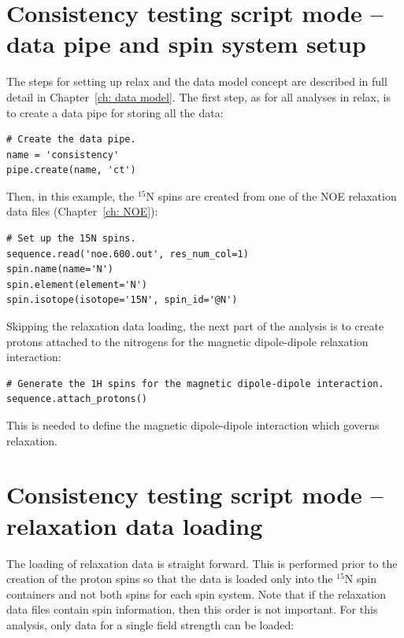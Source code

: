 
\section{Consistency testing script mode -- data pipe and spin system setup}

The steps for setting up relax and the data model concept are described in full detail in Chapter~\ref{ch: data model}.
The first step, as for all analyses in relax, is to create a data pipe for storing all the data:

\begin{lstlisting}[firstnumber=31]
# Create the data pipe.
name = 'consistency'
pipe.create(name, 'ct')
\end{lstlisting}

Then, in this example, the $^{15}$N spins are created from one of the NOE relaxation data files (Chapter~\ref{ch: NOE}):

\begin{lstlisting}[firstnumber=35]
# Set up the 15N spins.
sequence.read('noe.600.out', res_num_col=1)
spin.name(name='N')
spin.element(element='N')
spin.isotope(isotope='15N', spin_id='@N')
\end{lstlisting}

Skipping the relaxation data loading, the next part of the analysis is to create protons attached to the nitrogens for the magnetic dipole-dipole relaxation interaction:

\begin{lstlisting}[firstnumber=46]
# Generate the 1H spins for the magnetic dipole-dipole interaction.
sequence.attach_protons()
\end{lstlisting}

This is needed to define the magnetic dipole-dipole interaction which governs relaxation.




\section{Consistency testing script mode -- relaxation data loading}

The loading of relaxation data is straight forward.
This is performed prior to the creation of the proton spins so that the data is loaded only into the $^{15}$N spin containers and not both spins for each spin system.
Note that if the relaxation data files contain spin information, then this order is not important.
For this analysis, only data for a single field strength can be loaded:

